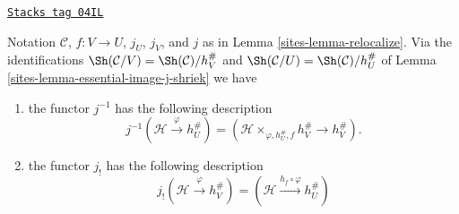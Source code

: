 \begin{lemma}
\label{sites-lemma-relocalize-explicit}
\href{https://stacks.math.columbia.edu/tag/04IL}{\texttt{Stacks tag 04IL}}

Notation $\mathcal{C}$, $f : V \to U$, $j_U$, $j_V$, and $j$ as in
Lemma \ref{sites-lemma-relocalize}. Via the identifications
$\Sh(\mathcal{C}/V) = \Sh(\mathcal{C})/h_V^\#$
and
$\Sh(\mathcal{C}/U) = \Sh(\mathcal{C})/h_U^\#$
of
Lemma \ref{sites-lemma-essential-image-j-shriek}
we have
\begin{enumerate}
\item the functor $j^{-1}$ has the following description
$$
j^{-1}(\mathcal{H} \xrightarrow{\varphi} h_U^\#)
=
(\mathcal{H} \times_{\varphi, h_U^\#, f} h_V^\# \to h_V^\#).
$$
\item the functor $j_!$ has the following description
$$
j_!(\mathcal{H} \xrightarrow{\varphi} h_V^\#) =
(\mathcal{H} \xrightarrow{h_f \circ \varphi} h_U^\#)
$$
\end{enumerate}
\end{lemma}


